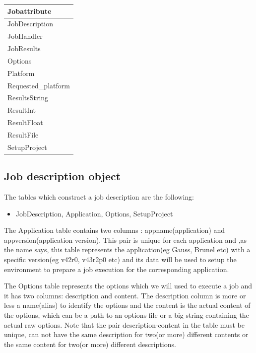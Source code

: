 \documentclass{lhcbnote}
\begin{document}
\begin{tabular}{ | l |}
\hline
	
Jobattribute \\ \hline
	
JobDescription \\ \hline
	
JobHandler \\ \hline
	
JobResults \\ \hline
	
Options \\ \hline
	
Platform \\ \hline
	
Requested\_platform \\ \hline
	
ResultsString \\ \hline
	
ResultInt \\ \hline
	
ResultFloat \\ \hline
	
ResultFile \\ \hline

SetupProject \\ \hline
\end{tabular}



\subsection{Job description object}
The tables which constract a job description are the following:
\begin{itemize}
\item
JobDescription, Application, Options, SetupProject
\end{itemize}

The Application table contains two columns : appname(application) and appversion(application version).
This pair is unique for each application and ,as the name says, this table represents the application(eg Gauss, Brunel etc)
with a specific version(eg v42r0, v43r2p0 etc) and its data will be used to setup the environment to prepare a job execution for 
the corresponding application.

\vspace{4 mm}

The Options table represents the options which we will used to execute a job and it has two columns:
description and content. The description column is more or less a name(alias) to identify the options and the
content is the actual content of the options, which can be a path to an options file or a big string containing 
the actual raw options. Note that the pair description-content in the table must be unique, can not have the same 
description for two(or more) different contents or the same content for two(or more) different descriptions.
\end{document}
